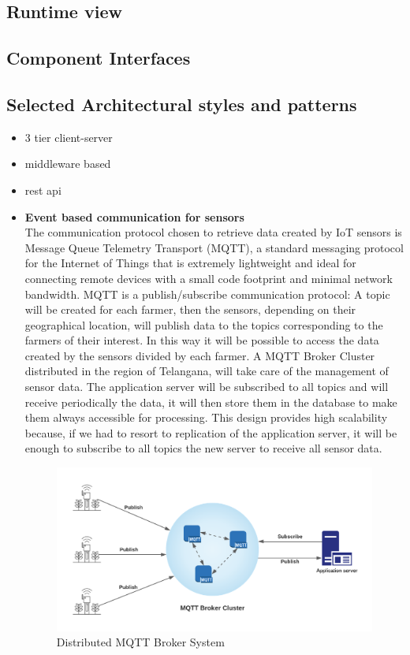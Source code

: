 \documentclass[10pt]{article} %
\begin{document}
\subsection{Runtime view}
\subsection{Component Interfaces}
\subsection{Selected Architectural styles and patterns}
\begin{itemize}
    \item 3 tier client-server
    \item middleware based
    \item rest api  
    \item \textbf{Event based communication for sensors}\\The communication protocol chosen to retrieve 
    data created by IoT sensors is Message Queue Telemetry Transport (MQTT), a standard messaging 
    protocol for the Internet of Things that is extremely lightweight and ideal for connecting remote 
    devices with a small code footprint and minimal network bandwidth. MQTT is a publish/subscribe 
    communication protocol: A topic will be created for each farmer, then the sensors, depending on 
    their geographical location, will publish data to the topics corresponding to the farmers of 
    their interest. In this way it will be possible to access the data created by the sensors divided 
    by each farmer. A MQTT Broker Cluster distributed in the region of Telangana, will take care of 
    the management of sensor data. The application server will be subscribed to all topics and will 
    receive periodically the data, it will then store them in the database to make them always 
    accessible for processing.
    This design provides high scalability because, if we had to resort to replication of the 
    application server, it will be enough to subscribe to all topics the new server to receive 
    all sensor data.
    \begin{figure}[h]
        \centering
        \includegraphics[scale=0.5]{images/mqtt.png}
        \caption{Distributed MQTT Broker System}
        \label{fig:ui_login}
    \end{figure}
\end{itemize}
\end{document}
